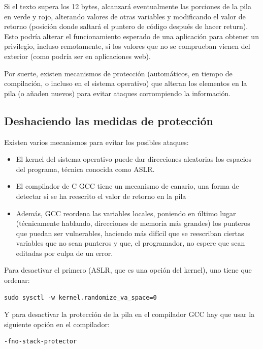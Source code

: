\documentclass[]{article}
\begin{document}
Si el texto supera los 12 bytes, alcanzará eventualmente las porciones de la pila en verde y rojo, alterando valores de otras variables y modificando el valor de retorno (posición donde saltará el puntero de código después de hacer return). Esto podría alterar el funcionamiento esperado de una aplicación para obtener un privilegio, incluso remotamente, si los valores que no se comprueban vienen del exterior (como podría ser en aplicaciones web).

Por suerte, existen mecanismos de protección (automáticos, en tiempo de compilación, o incluso en el sistema operativo) que alteran los elementos en la pila (o añaden nuevos) para evitar ataques corrompiendo la información.

\subsection{Deshaciendo las medidas de protección}

Existen varios mecanismos para evitar los posibles ataques:

\begin{itemize}
	\item El kernel del sistema operativo puede dar direcciones aleatorias los espacios del programa, técnica conocida como ASLR\cite{ASLR}.
	\item El compilador de C GCC tiene un mecanismo de canario, una forma de detectar si se ha reescrito el valor de retorno en la pila\cite{bocanary}
	\item Además, GCC reordena las variables locales, poniendo en último lugar (técnicamente hablando, direcciones de memoria más grandes) los punteros que puedan ser vulnerables, haciendo más difícil que se reescriban ciertas variables que no sean punteros y que, el programador, no espere que sean editadas por culpa de un error.
\end{itemize}

Para desactivar el primero (ASLR, que es una opción del kernel), uno tiene que ordenar:

\begin{verbatim}
sudo sysctl -w kernel.randomize_va_space=0
\end{verbatim}

Y para desactivar la protección de la pila en el compilador GCC hay que usar la siguiente opción en el compilador:

\begin{verbatim}
-fno-stack-protector
\end{verbatim}
\end{document}
